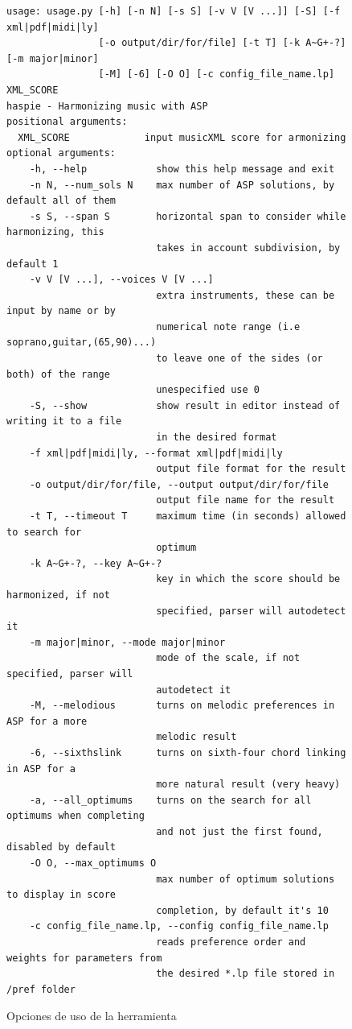 \begin{figure}
	\begin{verbatim}
usage: usage.py [-h] [-n N] [-s S] [-v V [V ...]] [-S] [-f xml|pdf|midi|ly]
                [-o output/dir/for/file] [-t T] [-k A~G+-?] [-m major|minor]
                [-M] [-6] [-O O] [-c config_file_name.lp] XML_SCORE
haspie - Harmonizing music with ASP
positional arguments:
  XML_SCORE             input musicXML score for armonizing
optional arguments:
    -h, --help            show this help message and exit
    -n N, --num_sols N    max number of ASP solutions, by default all of them
    -s S, --span S        horizontal span to consider while harmonizing, this
                          takes in account subdivision, by default 1
    -v V [V ...], --voices V [V ...]
                          extra instruments, these can be input by name or by
                          numerical note range (i.e soprano,guitar,(65,90)...)
                          to leave one of the sides (or both) of the range
                          unespecified use 0
    -S, --show            show result in editor instead of writing it to a file
                          in the desired format
    -f xml|pdf|midi|ly, --format xml|pdf|midi|ly
                          output file format for the result
    -o output/dir/for/file, --output output/dir/for/file
                          output file name for the result
    -t T, --timeout T     maximum time (in seconds) allowed to search for 
                          optimum
    -k A~G+-?, --key A~G+-?
                          key in which the score should be harmonized, if not
                          specified, parser will autodetect it
    -m major|minor, --mode major|minor
                          mode of the scale, if not specified, parser will 
                          autodetect it
    -M, --melodious       turns on melodic preferences in ASP for a more
                          melodic result
    -6, --sixthslink      turns on sixth-four chord linking in ASP for a
                          more natural result (very heavy)
    -a, --all_optimums    turns on the search for all optimums when completing
                          and not just the first found, disabled by default
    -O O, --max_optimums O
                          max number of optimum solutions to display in score
                          completion, by default it's 10
    -c config_file_name.lp, --config config_file_name.lp
                          reads preference order and weights for parameters from 
                          the desired *.lp file stored in /pref folder
	\end{verbatim}
	\label{fig:usage}
	\caption{Opciones de uso de la herramienta}
\end{figure}

